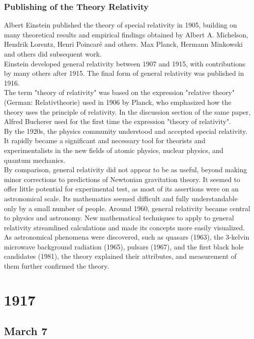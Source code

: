 \documentclass[11pt]{report}
\begin{document}
\subsection{Publishing of the Theory Relativity}
Albert Einstein published the theory of special relativity in 1905, building on many theoretical results and empirical findings obtained by Albert A. Michelson, Hendrik Lorentz, Henri Poincaré and others. Max Planck, Hermann Minkowski and others did subsequent work.\\
\indent Einstein developed general relativity between 1907 and 1915, with contributions by many others after 1915. The final form of general relativity was published in 1916.\\
\indent The term "theory of relativity" was based on the expression "relative theory" (German: Relativtheorie) used in 1906 by Planck, who emphasized how the theory uses the principle of relativity. In the discussion section of the same paper, Alfred Bucherer used for the first time the expression "theory of relativity".\\
\indent By the 1920s, the physics community understood and accepted special relativity. It rapidly became a significant and necessary tool for theorists and experimentalists in the new fields of atomic physics, nuclear physics, and quantum mechanics.\\
\indent By comparison, general relativity did not appear to be as useful, beyond making minor corrections to predictions of Newtonian gravitation theory. It seemed to offer little potential for experimental test, as most of its assertions were on an astronomical scale. Its mathematics seemed difficult and fully understandable only by a small number of people. Around 1960, general relativity became central to physics and astronomy. New mathematical techniques to apply to general relativity streamlined calculations and made its concepts more easily visualized. As astronomical phenomena were discovered, such as quasars (1963), the 3-kelvin microwave background radiation (1965), pulsars (1967), and the first black hole candidates (1981), the theory explained their attributes, and measurement of them further confirmed the theory.

\chapter{1917}
\section{March 7}
\end{document}
